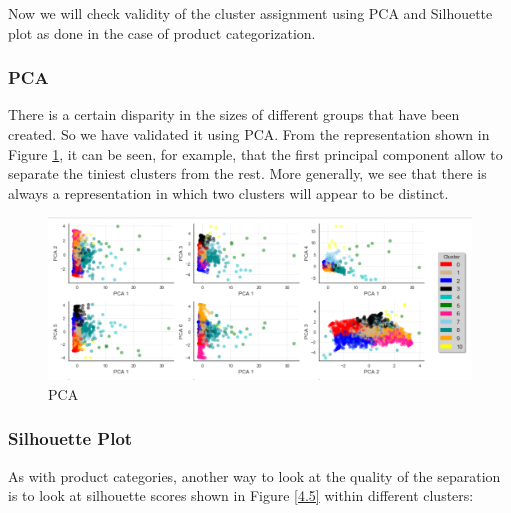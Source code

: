 Now we will check validity of the cluster assignment using PCA and Silhouette plot as done in the case of product categorization.\\

\subsubsection{\textbf{PCA}}

There is a certain disparity in the sizes of different groups that have been created. So we have validated it using PCA. From the representation shown in Figure \ref{4.4}, it can be seen, for example, that the first principal component allow to separate the tiniest clusters from the rest. More generally, we see that there is always a representation in which two clusters will appear to be distinct.\\


\begin{figure}
\caption{PCA}
\label{4.4}
\centering
\includegraphics[width=\columnwidth]{images/4_4.PNG}
\end{figure}

\subsubsection{\textbf{Silhouette Plot}}

As with product categories, another way to look at the quality of the separation is to look at silhouette scores shown in Figure \ref{4.5} within different clusters:\\

